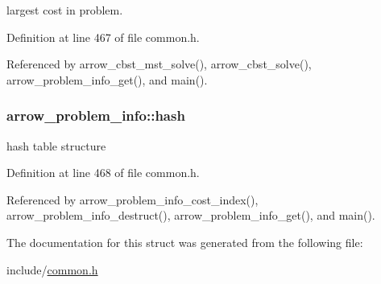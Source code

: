 largest cost in problem. 

Definition at line 467 of file common.h.

Referenced by arrow\_\-cbst\_\-mst\_\-solve(), arrow\_\-cbst\_\-solve(), arrow\_\-problem\_\-info\_\-get(), and main().\hypertarget{structarrow__problem__info_d62672139bdce70b23d8c72ecd96ff0d}{
\subsubsection{ {\bf arrow\_\-problem\_\-info::hash}}}
\label{structarrow__problem__info_d62672139bdce70b23d8c72ecd96ff0d}


hash table structure 

Definition at line 468 of file common.h.

Referenced by arrow\_\-problem\_\-info\_\-cost\_\-index(), arrow\_\-problem\_\-info\_\-destruct(), arrow\_\-problem\_\-info\_\-get(), and main().

The documentation for this struct was generated from the following file:\begin{CompactItemize}
\item 
include/\hyperlink{common_8h}{common.h}\end{CompactItemize}
